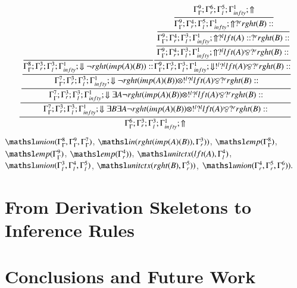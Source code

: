 \documentclass[a4paper,10pt]{article}
\newcommand{\elin}[2]{\ensuremath{{\tsl{unitctx}(\ensuremath{#1}, \ensuremath{#2})}}}
\newcommand{\emp}[1]{\ensuremath{{\tsl{emp}(\ensuremath{#1})}}}
\newcommand{\union}[3]{\ensuremath{{\tsl{union}(\ensuremath{#1},\ensuremath{#2},\ensuremath{ #3})}}}
\newcommand{\In}[2]{\ensuremath{\tsl{in}(\ensuremath{#1},\ensuremath{#2})}}
\begin{document}
{\small
\[
\cfrac{\cfrac{\cfrac{\cfrac{\cfrac{}
{\Gamma_{ \Gamma}^{8} ; \Gamma_{r}^{3} ; \Gamma_{l}^{3} ; \Gamma_{ infty}^{1} ;  \Downarrow \neg rght (imp (A) (B) )  :: }
\cfrac{\cfrac{\cfrac{\cfrac{\Gamma_{ \Gamma}^{9} ; \Gamma_{r}^{6} ; \Gamma_{l}^{5} ; \Gamma_{ infty}^{1} ;  \Uparrow }
{\Gamma_{ \Gamma}^{9} ; \Gamma_{r}^{4} ; \Gamma_{l}^{5} ; \Gamma_{ infty}^{1} ;  \Uparrow  ?^{r} rght (B)  :: }}
{\Gamma_{ \Gamma}^{9} ; \Gamma_{r}^{4} ; \Gamma_{l}^{3} ; \Gamma_{ infty}^{1} ;  \Uparrow  ?^{l} lft (A)  ::  ?^{r} rght (B)  :: }}
{\Gamma_{ \Gamma}^{9} ; \Gamma_{r}^{4} ; \Gamma_{l}^{3} ; \Gamma_{ infty}^{1} ;  \Uparrow  ?^{l} lft (A)  \bindnasrepma  ?^{r} rght (B)  :: }}
{\Gamma_{ \Gamma}^{9} ; \Gamma_{r}^{3} ; \Gamma_{l}^{3} ; \Gamma_{ infty}^{1} ;  \Downarrow  !^{l}  ?^{l} lft (A)  \bindnasrepma  ?^{r} rght (B)  :: }}
{\Gamma_{ \Gamma}^{7} ; \Gamma_{r}^{3} ; \Gamma_{l}^{3} ; \Gamma_{ infty}^{1} ;  \Downarrow \neg rght (imp (A) (B) )  \otimes  !^{l}  ?^{l} lft (A)  \bindnasrepma  ?^{r} rght (B)  :: }}
{\Gamma_{ \Gamma}^{7} ; \Gamma_{r}^{3} ; \Gamma_{l}^{3} ; \Gamma_{ infty}^{1} ;  \Downarrow \exists A \neg rght (imp (A) (B) )  \otimes  !^{l}  ?^{l} lft (A)  \bindnasrepma  ?^{r} rght (B)  :: }}
{\Gamma_{ \Gamma}^{7} ; \Gamma_{r}^{3} ; \Gamma_{l}^{3} ; \Gamma_{ infty}^{1} ;  \Downarrow \exists B \exists A \neg rght (imp (A) (B) )  \otimes  !^{l}  ?^{l} lft (A)  \bindnasrepma  ?^{r} rght (B)  :: }}
{\Gamma_{ \Gamma}^{6} ; \Gamma_{r}^{3} ; \Gamma_{l}^{3} ; \Gamma_{ infty}^{1} ;  \Uparrow }
\]
}
 $\union{\Gamma_{ \Gamma}^{8}}{\Gamma_{ \Gamma}^{9}}{\Gamma_{ \Gamma}^{7}}$, $\In{rght (imp (A) (B)) }{ \Gamma_{r}^{3})}$, $\emp{\Gamma_{ \Gamma}^{8}}$, $\emp{\Gamma_{ \Gamma}^{9}}$, $\emp{\Gamma_{r}^{4})}$, $\elin{lft (A)}{ \Gamma_{l}^{4}}$, $\union{\Gamma_{l}^{3}} {\Gamma_{l}^{4}} {\Gamma_{l}^{5}}$, $\elin{rght (B)}{ \Gamma_{r}^{5})}$, $\union{\Gamma_{r}^{4}}{\Gamma_{r}^{5} } {\Gamma_{r}^{6})}.$





\section{From Derivation Skeletons to Inference Rules}

\section{Conclusions and Future Work}



\end{document}
